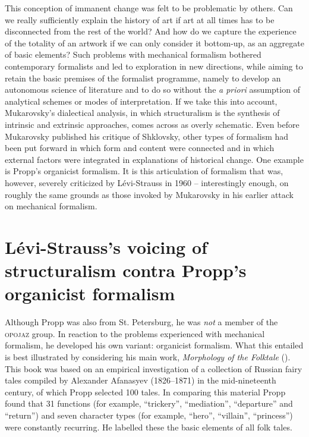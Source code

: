 \documentclass[output=paper]{langscibook}
\begin{document}
This conception of immanent change was felt to be problematic by others. Can we really sufficiently explain the history of art if art at all times has to be disconnected from the rest of the world? And how do we capture the experience of the totality of an artwork if we can only consider it bottom-up, as an aggregate of basic elements? Such problems with mechanical formalism bothered contemporary formalists and led to exploration in new directions, while aiming to retain the basic premises of the formalist programme, namely to develop an autonomous science of literature and to do so without the \emph{a priori} assumption of analytical schemes or modes of interpretation. If we take this into account, Mukarovsky's dialectical analysis, in which structuralism is the synthesis of intrinsic and extrinsic approaches, comes across as overly schematic. Even before Mukarovsky published his critique of Shklovsky, other types of formalism had been put forward in which form and content were connected and in which external factors were integrated in explanations of historical change. One example is Propp's organicist formalism. It is this articulation of formalism that was, however, severely criticized by Lévi-Strauss in 1960 -- interestingly enough, on roughly the same grounds as those invoked by Mukarovsky in his earlier attack on mechanical formalism. 

\section{Lévi-Strauss's voicing of structuralism contra Propp's organicist formalism}
\label{sec:karstens:levi-strauss}

Although Propp was also from St. Petersburg, he was \emph{not} a member of the \textsc{opojaz} group. In reaction to the problems experienced with mechanical formalism, he developed his own variant: organicist formalism. What this entailed is best illustrated by considering his main work, \emph{Morphology of the Folktale} (\citeyear{Propp1928}). This book was based on an empirical investigation of a collection of Russian fairy tales compiled by Alexander Afanasyev (1826--1871) in the mid-nineteenth century, of which Propp selected 100 tales. In comparing this material Propp found that 31 functions (for example, ``trickery'', ``mediation'', ``departure'' and ``return'') and seven character types (for example, ``hero'', ``villain'', ``princess'') were constantly recurring. He labelled these  the basic elements of all folk tales. 
\end{document}
